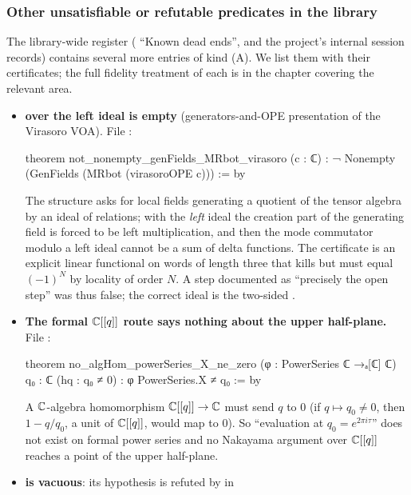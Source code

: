 \subsubsection{Other unsatisfiable or refutable predicates in the library}

The library-wide register ( ``Known dead ends'', and the project's internal session records) contains several more
entries of kind (A). We list them with their certificates; the full fidelity treatment of each is
in the chapter covering the relevant area.

\begin{itemize}
\item \textbf{ over the left ideal  is empty} (generators-and-OPE
  presentation of the Virasoro VOA). File :
\begin{leancode}
theorem not_nonempty_genFields_MRbot_virasoro (c : ℂ) :
    ¬ Nonempty (GenFields (MRbot (virasoroOPE c))) := by
\end{leancode}
  The structure  asks for local fields generating a quotient of the tensor
  algebra by an ideal of relations; with the \emph{left} ideal  the creation part of
  the generating field is forced to be left multiplication, and then the mode commutator modulo a
  left ideal cannot be a sum of delta functions. The certificate is an explicit linear functional
  on words of length three that kills  but must equal $(-1)^N$ by locality of order $N$.
  A step documented as ``precisely the open step'' was thus false; the correct ideal is the
  two-sided .
\item \textbf{The formal ${\mathbb{C}}[[q]]$ route says nothing about the upper half-plane.} File
  :
\begin{leancode}
theorem no_algHom_powerSeries_X_ne_zero (φ : PowerSeries ℂ →ₐ[ℂ] ℂ) {q₀ : ℂ} (hq : q₀ ≠ 0) :
    φ PowerSeries.X ≠ q₀ := by
\end{leancode}
  A ${\mathbb{C}}$-algebra homomorphism ${\mathbb{C}}[[q]]\to{\mathbb{C}}$ must send $q$ to $0$ (if $q\mapsto q_0\ne0$, then
  $1-q/q_0$, a unit of ${\mathbb{C}}[[q]]$, would map to $0$). So ``evaluation at $q_0=e^{2\pi i\tau}$''
  does not exist on formal power series and no Nakayama argument over ${\mathbb{C}}[[q]]$ reaches a point of
  the upper half-plane.
\item \textbf{ is vacuous}: its
  hypothesis  is refuted by  in

\end{itemize}
